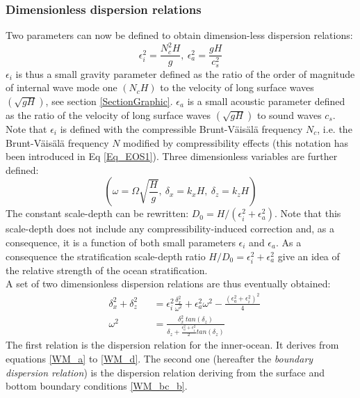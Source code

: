 \documentclass[a4paper,11pt]{article}
\begin{document}
\subsubsection{Dimensionless dispersion relations}
Two parameters can now be defined to obtain dimension-less dispersion relations:
\begin{equation}
     \epsilon_i^2 =  \frac{N_c^2 H}{g} 
    ,\ \epsilon_a^2 = \frac{g H}{c_s^2} 
\end{equation}
$\epsilon_i$ is thus a small gravity parameter defined as the ratio of the order of magnitude of internal wave mode one $(N_c H)$ to the velocity of long surface waves $(\sqrt{gH})$, see section \ref{SectionGraphic}.
$\epsilon_a$ is a small acoustic parameter defined as the ratio of the velocity of long surface waves $(\sqrt{gH})$ to sound waves $c_s$. Note that $\epsilon_i$ is defined with the compressible Brunt-Väisälä frequency $N_c$, i.e. the Brunt-Väisälä frequency $N$ modified by compressibility effects (this notation has been introduced in Eq \ref{Eq_EOS1}). Three dimensionless variables are further defined:
\begin{equation}
    \left( \omega = \Omega \sqrt{\frac{H}{g}}
    ,\ \delta_x = k_x H
    ,\ \delta_z = k_z H \right)
\end{equation}
The constant scale-depth can be rewritten: $D_0=H/(\epsilon_i^2+\epsilon_a^2)$.  Note that this scale-depth does not include any compressibility-induced correction and, as a consequence, it is a function of both small parameters $\epsilon_i$ and $\epsilon_a$. As a consequence the stratification scale-depth ratio $H/D_0=\epsilon_i^2+\epsilon_a^2$ give an idea of the relative strength of the ocean stratification.\\
A set of two dimensionless dispersion relations are thus eventually obtained:
\begin{subequations}
	\label{EqFullDisper}
	\begin{alignat}{2}	
		\label{EqFullDispera}
 		& \delta_x^2+\delta_z^2 &&=\epsilon_i^2\frac{\delta_x^2}
 			{\omega^2}+\epsilon_a^2\omega^2-\frac{(\epsilon_a^2+\epsilon_i^2)^2}{4}\\[3mm]
		\label{EqFullDisperb}
		& \omega^2 &&=\frac{\delta_x^2\ tan(\delta_z)}
		{\delta_z+\frac{\epsilon_a^2+\epsilon_i^2}			{2}tan(\delta_z)}
	\end{alignat}
\end{subequations}
The first relation is the dispersion relation for the inner-ocean. It derives from equations \ref{WM_a} to \ref{WM_d}. The second one (hereafter the \textit{boundary dispersion relation}) is the dispersion relation deriving from the surface and bottom boundary conditions \ref{WM_bc_b}.
\end{document}
